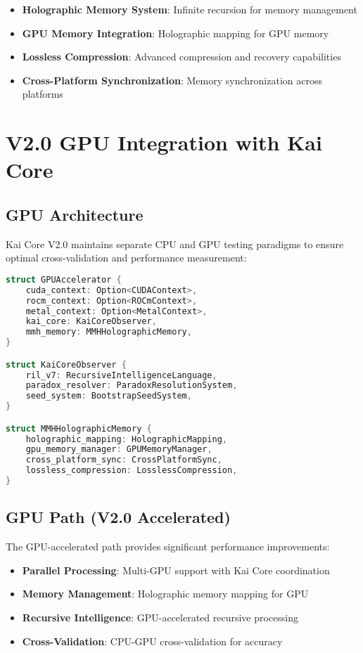 \documentclass[12pt,a4paper]{article}
\begin{document}
\begin{itemize}
    \item \textbf{Holographic Memory System}: Infinite recursion for memory management
    \item \textbf{GPU Memory Integration}: Holographic mapping for GPU memory
    \item \textbf{Lossless Compression}: Advanced compression and recovery capabilities
    \item \textbf{Cross-Platform Synchronization}: Memory synchronization across platforms
\end{itemize}

\newpage

\section{V2.0 GPU Integration with Kai Core}

\subsection{GPU Architecture}
Kai Core V2.0 maintains separate CPU and GPU testing paradigms to ensure optimal cross-validation and performance measurement:

\begin{lstlisting}[language=C, caption=GPU Integration Architecture]
struct GPUAccelerator {
    cuda_context: Option<CUDAContext>,
    rocm_context: Option<ROCmContext>,
    metal_context: Option<MetalContext>,
    kai_core: KaiCoreObserver,
    mmh_memory: MMHHolographicMemory,
}

struct KaiCoreObserver {
    ril_v7: RecursiveIntelligenceLanguage,
    paradox_resolver: ParadoxResolutionSystem,
    seed_system: BootstrapSeedSystem,
}

struct MMHHolographicMemory {
    holographic_mapping: HolographicMapping,
    gpu_memory_manager: GPUMemoryManager,
    cross_platform_sync: CrossPlatformSync,
    lossless_compression: LosslessCompression,
}
\end{lstlisting}

\subsection{GPU Path (V2.0 Accelerated)}
The GPU-accelerated path provides significant performance improvements:

\begin{itemize}
    \item \textbf{Parallel Processing}: Multi-GPU support with Kai Core coordination
    \item \textbf{Memory Management}: Holographic memory mapping for GPU
    \item \textbf{Recursive Intelligence}: GPU-accelerated recursive processing
    \item \textbf{Cross-Validation}: CPU-GPU cross-validation for accuracy
\end{itemize}
\end{document}
